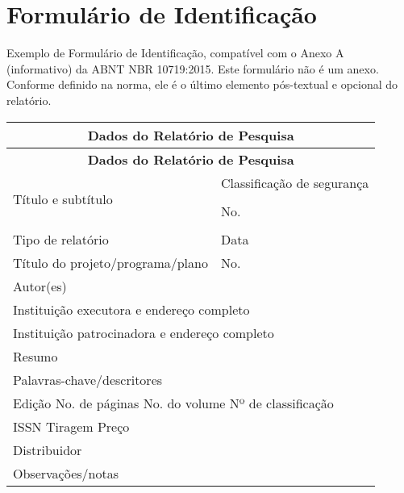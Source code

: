 
\chapter*[Formulário de Identificação]{Formulário de Identificação}
\label{formulado-identificacao}

Exemplo de Formulário de Identificação, compatível com o Anexo A (informativo) da ABNT NBR 10719:2015. Este formulário não é um anexo. Conforme definido na norma, ele é o último elemento pós-textual e opcional do relatório.

\bigskip

\begin{longtable}{|p{9cm}|p{5cm}|}
  \hline
  \multicolumn{2}{|c|}{\textbf{\large Dados do Relatório de Pesquisa}}\\
  \hline \endfirsthead

  \hline
  \multicolumn{2}{|c|}{\textbf{\large Dados do Relatório de Pesquisa}}\\
  \hline \endhead

  \multirow{4}{10cm}[24pt]{Título e subtítulo}& Classificação de segurança\\
  & \\
  \cline{2-2}
  & No.\\
  & \\
  
  \hline
  Tipo de relatório & Data\\
  \hline
  Título do projeto/programa/plano & No.\\
  \hline
  \multicolumn{2}{|l|}{Autor(es)} \\
  \hline
  \multicolumn{2}{|l|}{Instituição executora e endereço completo} \\
  \hline
  \multicolumn{2}{|l|}{Instituição patrocinadora e endereço completo} \\
  \hline
  \multicolumn{2}{|l|}{Resumo}\\[3cm]
  \hline
  \multicolumn{2}{|l|}{Palavras-chave/descritores}\\
  \hline
  \multicolumn{2}{|l|}{
    Edição \hfill No. de páginas \hfill No. do volume \hfill Nº de classificação \phantom{XXXX}} \\
  \hline
  \multicolumn{2}{|l|}{
    ISSN \hfill \hfill Tiragem \hfill Preço \phantom{XXXXXXXX}} \\
  \hline
  \multicolumn{2}{|l|}{Distribuidor} \\
  \hline
  \multicolumn{2}{|l|}{Observações/notas}\\[3cm]
  \hline
\end{longtable}
